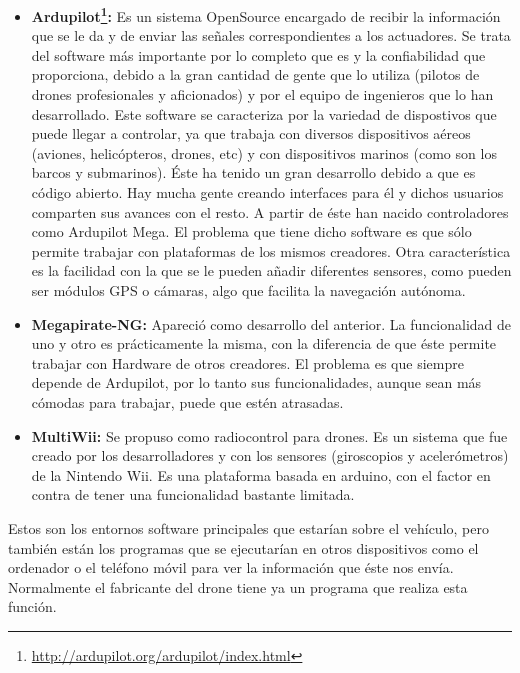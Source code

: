 	\begin{itemize}
		\item \textbf{Ardupilot\footnote{\url{http://ardupilot.org/ardupilot/index.html}}:} Es un sistema OpenSource encargado de recibir la informaci\'on que se le da y de enviar las señales correspondientes a los actuadores. Se trata del software m\'as importante por lo completo que es y la confiabilidad que proporciona, debido a la gran cantidad de gente que lo utiliza (pilotos de drones profesionales y aficionados) y por el equipo de ingenieros que lo han desarrollado. Este software se caracteriza por la variedad de dispostivos que puede llegar a controlar, ya que trabaja con diversos dispositivos a\'ereos (aviones, helic\'opteros, drones, etc) y con dispositivos marinos (como son los barcos y submarinos). \'Este ha tenido un gran desarrollo debido a que es c\'odigo abierto. Hay mucha gente creando interfaces para \'el y dichos usuarios comparten sus avances con el resto. A partir de \'este han nacido controladores como Ardupilot Mega. El problema que tiene dicho software es que s\'olo permite trabajar con plataformas de los mismos creadores. Otra caracter\'istica es la facilidad con la que se le pueden añadir diferentes sensores, como pueden ser m\'odulos GPS o c\'amaras, algo que facilita la navegaci\'on aut\'onoma. 

	\item \textbf{Megapirate-NG:} Apareci\'o como desarrollo del anterior. La funcionalidad de uno y otro es pr\'acticamente la misma, con la diferencia de que \'este permite trabajar con Hardware de otros creadores. El problema es que siempre depende de Ardupilot, por lo tanto sus funcionalidades, aunque sean m\'as c\'omodas para trabajar, puede que est\'en atrasadas.

		\item \textbf{MultiWii:} Se propuso como radiocontrol para drones. Es un sistema que fue creado por los desarrolladores y con los sensores (giroscopios y aceler\'ometros) de la Nintendo Wii. Es una plataforma basada en arduino, con el factor en contra de tener una funcionalidad bastante limitada. 
	\end{itemize}


Estos son los entornos software principales que estar\'ian sobre el veh\'iculo, pero tambi\'en est\'an los programas que se ejecutar\'ian en otros dispositivos como el ordenador o el tel\'efono m\'ovil para ver la informaci\'on que \'este nos env\'ia. Normalmente el fabricante del drone tiene ya un programa que realiza esta funci\'on. 


